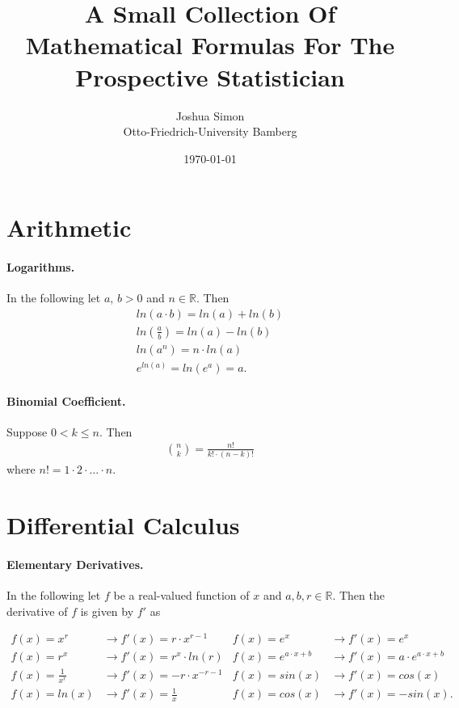 \documentclass[a4paper,11pt]{article}
\title{A Small Collection Of Mathematical Formulas For The 
Prospective Statistician}
\author{Joshua Simon  \\
	Otto-Friedrich-University Bamberg \\
	}
\date{\today}
\begin{document}
\maketitle



\section{Arithmetic}
\paragraph{Logarithms.} In the following let $a$, $b > 0$ and $n \in \mathbb{R}$. Then
\begin{gather*}
    ln(a \cdot b) = ln(a) + ln(b) \\
    ln(\frac{a}{b}) = ln(a) - ln(b) \\
    ln(a^n) = n \cdot ln(a) \\
    e^{ln(a)} = ln(e^{a}) = a.
\end{gather*}

\paragraph{Binomial Coefficient.} Suppose $0 < k \leq n$. Then
\begin{gather*}
    \binom{n}{k} = \frac{n!}{k! \cdot (n-k)!}
\end{gather*}
where $n! = 1 \cdot 2 \cdot \ldots \cdot n$.



\section{Differential Calculus} \label{DifferentialCalculus}
\paragraph{Elementary Derivatives.} In the following let $f$ be a real-valued function of $x$ and $a, b, r \in \mathbb{R}$. Then the derivative of $f$ is given by $f'$ as

\begin{align*}
    f(x) = x^r &\rightarrow f'(x) = r \cdot x^{r - 1} 
    &f(x) = e^x &\rightarrow f'(x) = e^x \\
    f(x) = r^x &\rightarrow f'(x) = r^x \cdot ln(r) 
    &f(x) = e^{a \cdot x + b} &\rightarrow f'(x) = a \cdot e^{a \cdot x + b} \\
    f(x) = \frac{1}{x^r}  &\rightarrow f'(x) = - r \cdot x^{-r - 1}
    &f(x) = sin(x) &\rightarrow f'(x) = cos(x) \\
    f(x) = ln(x) &\rightarrow f'(x) = \frac{1}{x} 
    &f(x) = cos(x) &\rightarrow f'(x) = - sin(x).
\end{align*}
\end{document}
